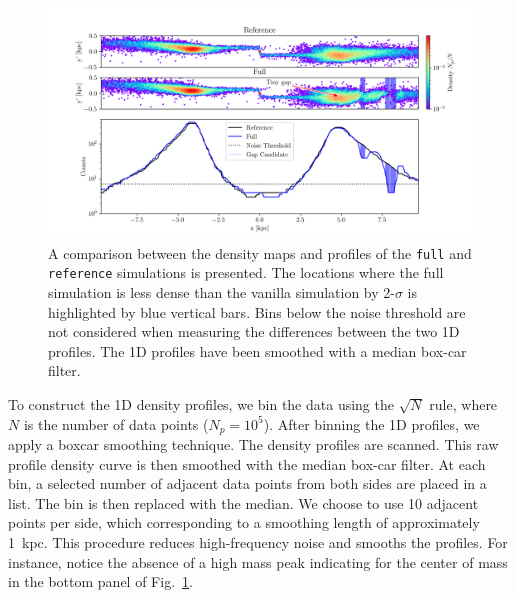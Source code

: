 \documentclass[draft]{aa}
\begin{document}
\begin{appendix}
    \begin{figure}
      \centering
      \includegraphics[width=\linewidth, trim=20 0 15 0]{monte-carlo-009-pouliasis2017pii-GCNBody-2000-milisigma-5-noisefactor-20-boxcarindexlength-shifted-0.png}
      \caption{A comparison between the density maps and profiles of the \texttt{full} and \texttt{reference} simulations is presented. The locations where the full simulation is less dense than the vanilla simulation by 2-$\sigma$ is highlighted by blue vertical bars. Bins below the noise threshold are not considered when measuring the differences between the two 1D profiles. The 1D profiles have been smoothed with a median box-car filter.}
      \label{fig:profiles}
      \end{figure}

    To construct the 1D density profiles, we bin the data using the $\sqrt{N}$ rule, where $N$ is the number of data points ($N_p = 10^5$). After binning the 1D profiles, we apply a boxcar smoothing technique. The density profiles are scanned. This raw profile density curve is then smoothed with the median box-car filter. At each bin, a selected number of adjacent data points from both sides are placed in a list. The bin is then replaced with the median. We choose to use 10 adjacent points per side, which corresponding to a smoothing length of approximately 1~kpc. This procedure reduces high-frequency noise and smooths the profiles. For instance, notice the absence of a high mass peak indicating for the center of mass in the bottom panel of Fig.~\ref{fig:profiles}.


\end{appendix}
\end{document}
